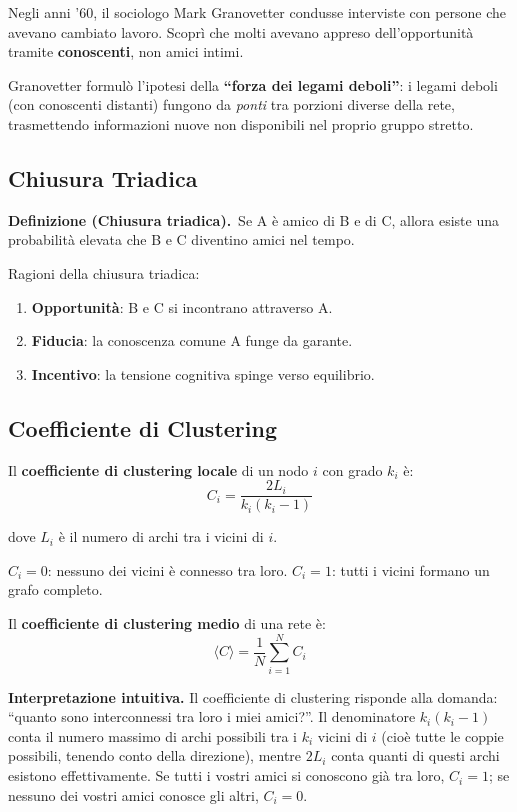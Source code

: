 \documentclass[12pt,a4paper]{article}
\newcommand{\definition}[2]{%
  \vspace{4pt}%
  \noindent\textbf{Definizione (#1).}\ #2\par\vspace{4pt}%
}
\newcommand{\formula}[1]{%
  \begin{equation*}#1\end{equation*}%
}
\begin{document}
Negli anni '60, il sociologo Mark Granovetter condusse interviste con persone che avevano
cambiato lavoro. Scoprì che molti avevano appreso dell'opportunità tramite
\textbf{conoscenti}, non amici intimi.

Granovetter formulò l'ipotesi della \textbf{``forza dei legami deboli''}: i legami deboli
(con conoscenti distanti) fungono da \emph{ponti} tra porzioni diverse della rete,
trasmettendo informazioni nuove non disponibili nel proprio gruppo stretto.

\subsection{Chiusura Triadica}

\definition{Chiusura triadica}{Se A è amico di B e di C, allora esiste una probabilità
elevata che B e C diventino amici nel tempo.}

\noindent Ragioni della chiusura triadica:
\begin{enumerate}
  \item \textbf{Opportunità}: B e C si incontrano attraverso A.
  \item \textbf{Fiducia}: la conoscenza comune A funge da garante.
  \item \textbf{Incentivo}: la tensione cognitiva spinge verso equilibrio.
\end{enumerate}

\subsection{Coefficiente di Clustering}

Il \textbf{coefficiente di clustering locale} di un nodo $i$ con grado $k_i$ è:
\formula{C_i = \frac{2L_i}{k_i(k_i-1)}}
dove $L_i$ è il numero di archi tra i vicini di $i$.

$C_i = 0$: nessuno dei vicini è connesso tra loro.
$C_i = 1$: tutti i vicini formano un grafo completo.

Il \textbf{coefficiente di clustering medio} di una rete è:
\formula{\langle C \rangle = \frac{1}{N}\sum_{i=1}^{N} C_i}

\medskip
\noindent\textbf{Interpretazione intuitiva.}
Il coefficiente di clustering risponde alla domanda: ``quanto sono interconnessi tra loro
i miei amici?''. Il denominatore $k_i(k_i-1)$ conta il numero massimo di archi possibili
tra i $k_i$ vicini di $i$ (cioè tutte le coppie possibili, tenendo conto della direzione),
mentre $2L_i$ conta quanti di questi archi esistono effettivamente. Se tutti i vostri amici
si conoscono già tra loro, $C_i = 1$; se nessuno dei vostri amici conosce gli altri,
$C_i = 0$.
\end{document}
